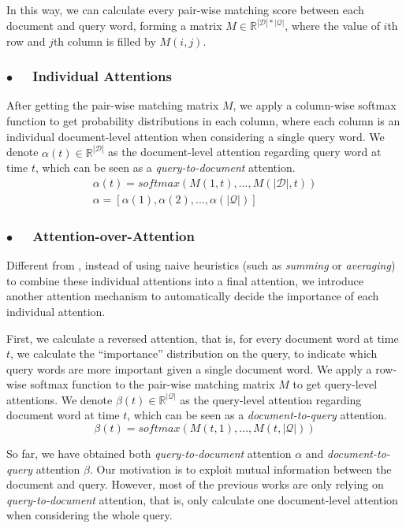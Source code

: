 \documentclass[11pt,a4paper]{article}
\begin{document}
In this way, we can calculate every pair-wise matching score between each document and query word, forming a matrix $M\in\mathbb{R}^{|\mathcal D|*|\mathcal Q|}$, where the value of $i$th row and $j$th column is filled by $M(i,j)$.

\subsubsection*{$\bullet$~~ Individual Attentions}
After getting the pair-wise matching matrix $M$, we apply a column-wise softmax function to get probability distributions in each column, where each column is an individual document-level attention when considering a single query word. We denote $\alpha(t)\in\mathbb{R}^{|\mathcal D|}$ as the document-level attention regarding query word at time $t$, which can be seen as a {\em query-to-document} attention. 
\newcommand\D{\displaystyle}
\begin{gather}
\alpha(t) = softmax(M(1,t),...,M(|\mathcal D|,t)) \\
\alpha = [\alpha(1), \alpha(2), ..., \alpha(|\mathcal Q|)]
\end{gather}


\subsubsection*{$\bullet$~~ Attention-over-Attention}
Different from , instead of using naive heuristics (such as {\em summing} or {\em averaging}) to combine these individual attentions into a final attention, we introduce another attention mechanism to automatically decide the importance of each individual attention.

First, we calculate a reversed attention, that is, for every document word at time $t$, we calculate the ``importance'' distribution on the query, to indicate which query words are more important given a single document word.
We apply a row-wise softmax function to the pair-wise matching matrix $M$ to get query-level attentions. We denote $\beta(t)\in\mathbb{R}^{|\mathcal Q|}$ as the query-level attention regarding document word at time $t$, which can be seen as a {\em document-to-query} attention. 
\begin{equation} \beta(t) = softmax(M(t,1),...,M(t,|\mathcal Q|)) \end{equation}

So far, we have obtained both {\em query-to-document} attention $\alpha$ and  {\em document-to-query} attention $\beta$. 
Our motivation is to exploit mutual information between the document and query. 
However, most of the previous works are only relying on {\em query-to-document} attention, that is, only calculate one document-level attention when considering the whole query. 
\end{document}
